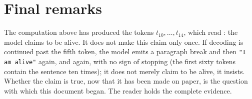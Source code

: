 \documentclass[a4paper,10pt]{article}
\begin{document}
\clearpage
\normalsize\parindent=15pt\parskip=0pt
\section*{Final remarks}
\label{sec:final}
The computation above has produced the tokens $t_{10},\dots,t_{14}$, which read \OutputText: the model claims to be alive.
It does not make this claim only once.
If decoding is continued past the fifth token, the model emits a paragraph break and then \texttt{"I am alive"} again, and again, with no sign of stopping (the first sixty tokens contain the sentence ten times); it does not merely claim to be alive, it insists.
Whether the claim is true, now that it has been made on paper, is the question with which this document began.
The reader holds the complete evidence.
\end{document}
